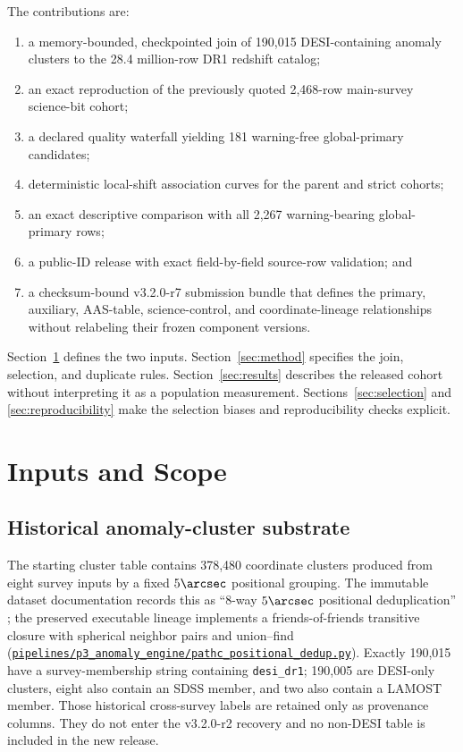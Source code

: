 \documentclass[twocolumn]{aastex701}
\newcommand{\repoBase}{https://github.com/Hubify-Projects/bigbounce/blob/main}
\newcommand{\artifact}[1]{\href{\repoBase/#1}{\nolinkurl{#1}}}
\newcommand{\releaseVersion}{v3.2.0-r2}
\newcommand{\bundleVersion}{v3.2.0-r7}
\begin{document}
The contributions are:
\begin{enumerate}
\item a memory-bounded, checkpointed join of 190,015 DESI-containing anomaly clusters to the
28.4 million-row DR1 redshift catalog;
\item an exact reproduction of the previously quoted 2,468-row main-survey science-bit cohort;
\item a declared quality waterfall yielding 181 warning-free global-primary candidates;
\item deterministic local-shift association curves for the parent and strict cohorts;
\item an exact descriptive comparison with all 2,267 warning-bearing global-primary rows;
\item a public-ID release with exact field-by-field source-row validation; and
\item a checksum-bound \bundleVersion{} submission bundle that defines the primary, auxiliary,
AAS-table, science-control, and coordinate-lineage relationships without relabeling their frozen component versions.
\end{enumerate}

Section~\ref{sec:data} defines the two inputs.  Section~\ref{sec:method} specifies the join,
selection, and duplicate rules.  Section~\ref{sec:results} describes the released cohort without
interpreting it as a population measurement.  Sections~\ref{sec:selection} and
\ref{sec:reproducibility} make the selection biases and reproducibility checks explicit.

\section{Inputs and Scope}\label{sec:data}

\subsection{Historical anomaly-cluster substrate}\label{sec:anomaly-input}

The starting cluster table contains 378,480 coordinate clusters produced from eight survey
inputs by a fixed $5\arcsec$ positional grouping.  The immutable dataset documentation records
this as ``8-way $5\arcsec$ positional deduplication'' \citep{Golden2026Data}; the preserved
executable lineage implements a friends-of-friends transitive closure with spherical neighbor
pairs and union--find
(\artifact{pipelines/p3\_anomaly\_engine/pathc\_positional\_dedup.py}).  Exactly 190,015 have a
survey-membership string containing \texttt{desi\_dr1};
190,005 are DESI-only clusters, eight also contain an SDSS member, and two also contain a LAMOST
member.  Those historical cross-survey labels are retained only as provenance columns.  They do
not enter the \releaseVersion{} recovery and no non-DESI table is included in the new release.
\end{document}
